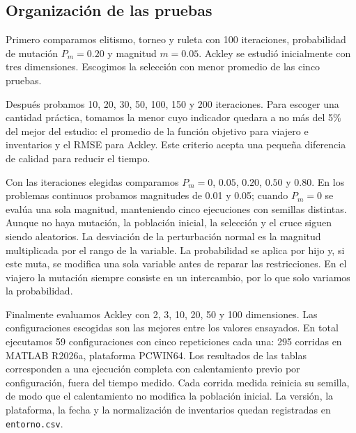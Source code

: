 \documentclass[conference]{IEEEtran}
\begin{document}
\subsection{Organización de las pruebas}
Primero comparamos elitismo, torneo y ruleta con 100 iteraciones, probabilidad de mutación $P_m=0.20$ y magnitud $m=0.05$. Ackley se estudió inicialmente con tres dimensiones. Escogimos la selección con menor promedio de las cinco pruebas.

Después probamos 10, 20, 30, 50, 100, 150 y 200 iteraciones. Para escoger una cantidad práctica, tomamos la menor cuyo indicador quedara a no más del 5\% del mejor del estudio: el promedio de la función objetivo para viajero e inventarios y el RMSE para Ackley. Este criterio acepta una pequeña diferencia de calidad para reducir el tiempo.

Con las iteraciones elegidas comparamos $P_m=0$, $0.05$, $0.20$, $0.50$ y $0.80$. En los problemas continuos probamos magnitudes de 0.01 y 0.05; cuando $P_m=0$ se evalúa una sola magnitud, manteniendo cinco ejecuciones con semillas distintas. Aunque no haya mutación, la población inicial, la selección y el cruce siguen siendo aleatorios. La desviación de la perturbación normal es la magnitud multiplicada por el rango de la variable. La probabilidad se aplica por hijo y, si este muta, se modifica una sola variable antes de reparar las restricciones. En el viajero la mutación siempre consiste en un intercambio, por lo que solo variamos la probabilidad.

Finalmente evaluamos Ackley con 2, 3, 10, 20, 50 y 100 dimensiones. Las configuraciones escogidas son las mejores entre los valores ensayados. En total ejecutamos 59 configuraciones con cinco repeticiones cada una: 295 corridas en MATLAB R2026a, plataforma PCWIN64. Los resultados de las tablas corresponden a una ejecución completa con calentamiento previo por configuración, fuera del tiempo medido. Cada corrida medida reinicia su semilla, de modo que el calentamiento no modifica la población inicial. La versión, la plataforma, la fecha y la normalización de inventarios quedan registradas en \texttt{entorno.csv}.
\end{document}
